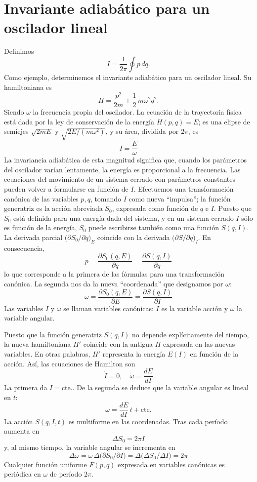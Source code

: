 \documentclass[12pt]{article}
\begin{document}
\section*{Invariante adiabático para un oscilador lineal}

Definimos
\[
I = \frac{1}{2\pi}\oint p\,dq.
\]
Como ejemplo, determinemos el invariante adiabático para un oscilador lineal. Su hamiltoniana es
\[
H = \frac{p^2}{2m} + \frac{1}{2}\,m\omega^2 q^2.
\]
Siendo \(\omega\) la frecuencia propia del oscilador. La ecuación de la trayectoria física está dada por la ley de conservación de la energía \(H(p,q)=E\); es una elipse de semiejes \(\sqrt{2mE}\) y \(\sqrt{2E/(m\omega^2)}\), y su área, dividida por \(2\pi\), es
\[
I = \frac{E}{\omega}
\tag{49.7}
\]
La invariancia adiabática de esta magnitud significa que, cuando los parámetros del oscilador varían lentamente, la energía es proporcional a la frecuencia. Las ecuaciones del movimiento de un sistema cerrado con parámetros constantes pueden volver a formularse en función de \(I\). Efectuemos una transformación canónica de las variables \(p,q\), tomando \(I\) como nueva “impulsa”; la función generatriz es la acción abreviada \(S_0\), expresada como función de \(q\) e \(I\). Puesto que \(S_0\) está definida para una energía dada del sistema, y en un sistema cerrado \(I\) sólo es función de la energía, \(S_0\) puede escribirse también como una función \(S(q,I)\). La derivada parcial \(\bigl(\partial S_0/\partial q\bigr)_E\) coincide con la derivada \(\bigl(\partial S/\partial q\bigr)_I\). En consecuencia,
\[
p = \frac{\partial S_0(q,E)}{\partial q}
  = \frac{\partial S(q,I)}{\partial q}
\tag{49.8}
\]
lo que corresponde a la primera de las fórmulas para una transformación canónica. La segunda nos da la nueva “coordenada” que designamos por \(\omega\):
\[
\omega = \frac{\partial S_0(q,E)}{\partial E}
        = \frac{\partial S(q,I)}{\partial I}
\tag{49.9}
\]
Las variables \(I\) y \(\omega\) se llaman variables canónicas: \(I\) es la variable acción y \(\omega\) la variable angular.

Puesto que la función generatriz \(S(q,I)\) no depende explícitamente del tiempo, la nueva hamiltoniana \(H'\) coincide con la antigua \(H\) expresada en las nuevas variables. En otras palabras, \(H'\) representa la energía \(E(I)\) en función de la acción. Así, las ecuaciones de Hamilton son
\[
\dot I = 0,\quad
\dot \omega = \frac{dE}{dI}
\tag{49.10}
\]
La primera da \(I=\mathrm{cte.}\). De la segunda se deduce que la variable angular es lineal en \(t\):
\[
\omega = \frac{dE}{dI}\,t + \mathrm{cte.}
\tag{49.11}
\]
La acción \(S(q,I,t)\) es multiforme en las coordenadas. Tras cada período aumenta en
\[
\Delta S_0 = 2\pi I
\tag{49.12}
\]
y, al mismo tiempo, la variable angular se incrementa en
\[
\Delta\omega
= \omega\,\Delta\bigl(\partial S_0/\partial I\bigr)
= \Delta\bigl(\Delta S_0/\Delta I\bigr)
= 2\pi
\tag{49.13}
\]
Cualquier función uniforme \(F(p,q)\) expresada en variables canónicas es periódica en \(\omega\) de período \(2\pi\).
\end{document}
